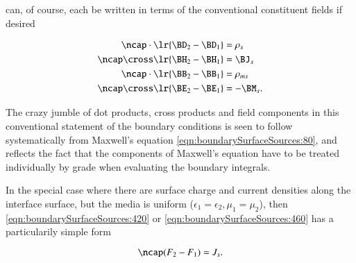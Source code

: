  can, of course,
each be written in terms of the conventional constituent fields if desired

%
%
\begin{dmath}\label{eqn:boundarySurfaceSources:460}
\begin{aligned}
\ncap \cdot \lr{ \BD_2 - \BD_1 } &= \rho_s \\
\ncap \cross \lr{ \BH_2 - \BH_1 } &= \BJ_s \\
\ncap \cdot \lr{ \BB_2 - \BB_1 } &= \rho_{ms} \\
\ncap \cross \lr{ \BE_2 - \BE_1 } &= -\BM_s.
\end{aligned}
\end{dmath}

The crazy jumble of dot products, cross products and field components in this conventional statement of the boundary conditions is seen to follow systematically from Maxwell's equation \cref{eqn:boundarySurfaceSources:80}, and reflects the fact that the components of Maxwell's equation have to be treated individually by grade when evaluating the boundary integrals.

In the special case where there are surface charge and current densities along the interface surface, but the media is uniform (\(\epsilon_1 = \epsilon_2, \mu_1 = \mu_2\)), then \cref{eqn:boundarySurfaceSources:420} or \cref{eqn:boundarySurfaceSources:460} has a particularily simple form \citep{chappell2014geometric}

\begin{dmath}\label{eqn:boundarySurfaceSources:421}
\ncap (F_2 - F_1) = J_s.
\end{dmath}

